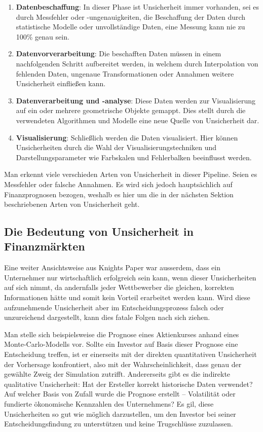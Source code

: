 \begin{enumerate}
    \item \textbf{Datenbeschaffung}:
    In dieser Phase ist Unsicherheit immer vorhanden, sei es durch Messfehler oder -ungenauigkeiten, die Beschaffung der Daten durch statistische Modelle oder unvollständige Daten, eine Messung kann nie zu 100\% genau sein.
    
    \item \textbf{Datenvorverarbeitung}:
    Die beschafften Daten müssen in einem nachfolgenden Schritt aufbereitet werden, in welchem durch Interpolation von fehlenden Daten, ungenaue Transformationen oder Annahmen weitere Unsicherheit einfließen kann.
    
    \item \textbf{Datenverarbeitung und -analyse}:
    Diese Daten werden zur Visualisierung auf ein oder mehrere geometrische Objekte gemappt. Dies stellt durch die verwendeten Algorithmen und Modelle eine neue Quelle von Unsicherheit dar.
    
    \item \textbf{Visualisierung}:
    Schließlich werden die Daten visualisiert. Hier können Unsicherheiten durch die Wahl der Visualisierungstechniken und Darstellungsparameter wie Farbskalen und Fehlerbalken beeinflusst werden.
\end{enumerate}

Man erkennt viele verschieden Arten von Unsicherheit in dieser Pipeline. Seien es Messfehler oder falsche Annahmen. Es wird sich jedoch hauptsächlich auf Finanzprognosen bezogen, weshalb es hier um die in der nächsten Sektion beschriebenen Arten von Unsicherheit geht.


\subsection{Die Bedeutung von Unsicherheit in Finanzmärkten}
Eine weiter Ansichtsweise aus Knights Paper war ausserdem, dass ein Unternehmer nur wirtschaftlich erfolgreich sein kann, wenn dieser Unsicherheiten auf sich nimmt, da andernfalls jeder Wettbewerber die gleichen, 
korrekten Informationen hätte und somit kein Vorteil erarbeitet werden kann. Wird diese aufzunehmende Unsicherheit aber im Entscheidungsprozess falsch oder unzureichend dargestellt, kann dies fatale Folgen nach sich ziehen.

Man stelle sich beispielsweise die Prognose eines Aktienkurses anhand eines Monte-Carlo-Modells vor. Sollte ein Investor auf Basis dieser Prognose eine Entscheidung treffen, ist er einerseits mit der direkten quantitativen 
Unsicherheit der Vorhersage konfrontiert, also mit der Wahrscheinlichkeit, dass genau der gewählte Zweig der Simulation zutrifft. Andererseits gibt es die indirekte qualitative Unsicherheit: 
Hat der Ersteller korrekt historische Daten verwendet? \cite{Padilla2021} Auf welcher Basis von Zufall wurde die Prognose erstellt – Volatilität oder fundierte ökonomische Kennzahlen des Unternehmens? 
Es gil, diese Unsicherheiten so gut wie möglich darzustellen, um den Investor bei seiner Entscheidungsfindung zu unterstützen und keine Trugschlüsse zuzulassen.


